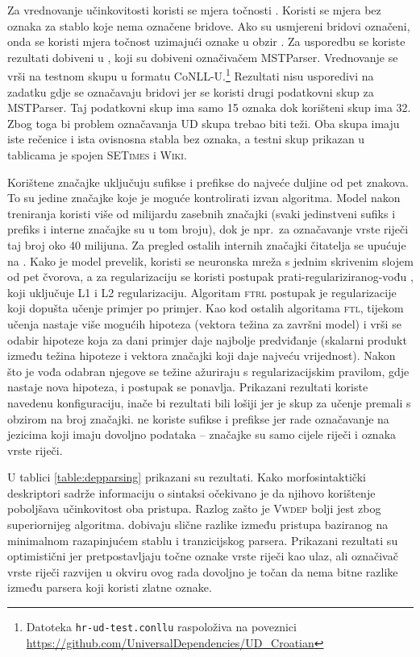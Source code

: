 Za vrednovanje učinkovitosti koristi se mjera točnosti . Koristi
se mjera bez oznaka  za stablo koje nema
označene bridove. Ako su usmjereni bridovi označeni, onda se koristi mjera
točnost uzimajući oznake u obzir . Za
usporedbu se koriste rezultati dobiveni u \citep{agic2013three}, koji su dobiveni
označivačem MSTParser. Vrednovanje se vrši na testnom skupu u formatu CoNLL-U.\footnote{Datoteka \texttt{hr-ud-test.conllu} raspoloživa na poveznici
\url{https://github.com/UniversalDependencies/UD_Croatian}} Rezultati nisu
usporedivi na zadatku gdje se označavaju bridovi jer se koristi drugi podatkovni
skup za MSTParser. Taj podatkovni skup ima samo 15 oznaka dok korišteni skup ima
32. Zbog toga bi problem označavanja UD skupa trebao biti teži. Oba skupa imaju
iste rečenice i ista ovisnosna stabla bez oznaka, a testni skup prikazan u
tablicama je spojen \textsc{SETimes} i \textsc{Wiki}.

Korištene značajke uključuju sufikse i prefikse do najveće duljine od pet
znakova. To su jedine značajke koje je moguće kontrolirati izvan algoritma.
Model nakon treniranja koristi više od milijardu zasebnih značajki (svaki
jedinstveni sufiks i prefiks i interne značajke su u tom broju), dok je npr.~za
označavanje vrste riječi taj broj oko 40 milijuna. Za pregled ostalih internih
značajki čitatelja se upućuje na \citep{chang2015learning}. Kako je model
prevelik, koristi se neuronska mreža s jednim skrivenim slojem od pet čvorova, a
za regularizaciju se koristi postupak prati-regulariziranog-vođu , koji uključuje L1 i L2 regularizaciju. Algoritam
\textsc{ftrl} postupak je regularizacije koji dopušta učenje primjer po primjer.
Kao kod ostalih algoritama \textsc{ftl}, tijekom učenja nastaje više mogućih
hipoteza (vektora težina za završni model) i vrši se odabir hipoteze koja za
dani primjer daje najbolje predviđanje (skalarni produkt između težina hipoteze
i vektora značajki koji daje najveću vrijednost). Nakon što je vođa odabran
njegove se težine ažuriraju s regularizacijskim pravilom, gdje nastaje nova
hipoteza, i postupak se ponavlja. Prikazani rezultati koriste navedenu
konfiguraciju, inače bi rezultati bili lošiji jer je skup za učenje premali s
obzirom na broj značajki. \citet{chang2015learning} ne koriste sufikse i
prefikse jer rade označavanje na jezicima koji imaju dovoljno podataka --
značajke su samo cijele riječi i oznaka vrste riječi.

U tablici \ref{table:depparsing} prikazani su rezultati. Kako morfosintaktički
deskriptori sadrže informaciju o sintaksi očekivano je da njihovo korištenje
poboljšava učinkovitost oba pristupa. Razlog zašto je \textsc{Vwdep} bolji jest
zbog superiornijeg algoritma. \citet{cer2010parsing} dobivaju slične razlike
između pristupa baziranog na minimalnom razapinjućem stablu i tranzicijskog
parsera. Prikazani rezultati su optimistični jer pretpostavljaju točne oznake
vrste riječi kao ulaz, ali označivač vrste riječi razvijen u okviru ovog rada
dovoljno je točan da nema bitne razlike između parsera koji koristi zlatne
oznake.

